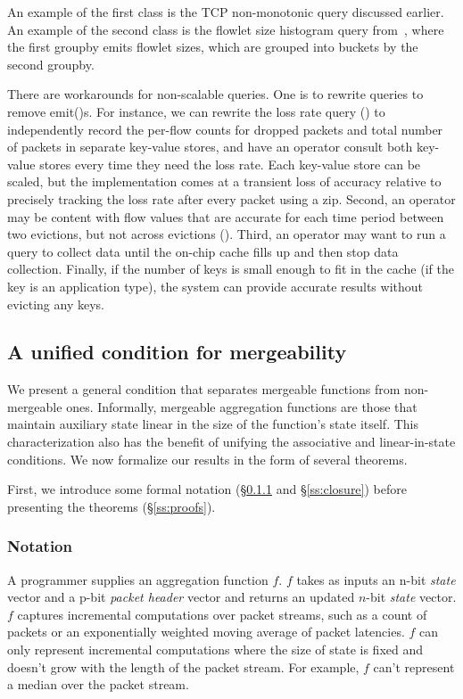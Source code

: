 An example of the first class is the TCP non-monotonic query discussed earlier.
An example of the second class is the flowlet size histogram
query from~, where the first {\ct groupby} emits
flowlet sizes, which are grouped into buckets by the second {\ct groupby}.

There are workarounds for non-scalable queries. One is to rewrite queries to
remove {\ct emit()}s.  For instance, we can rewrite the loss rate query
() to independently record the per-flow counts for
dropped packets and total number of packets in separate key-value stores, and
have an operator consult both key-value stores every time they need the loss
rate. Each key-value store can be scaled, but the implementation comes at a
transient loss of accuracy relative to precisely tracking the loss rate after
every packet using a {\ct zip.} Second, an operator may be content with flow
values that are accurate for each time period between two evictions, but not
across evictions (). Third, an operator may want to run a
query to collect data until the on-chip cache fills up and then stop data
collection.  Finally, if the number of keys is small enough to fit in the cache
(\eg if the key is an application type), the system can provide accurate
results without evicting any keys.

\subsection{A unified condition for mergeability}
\label{sec:unifies}
We present a general condition that separates mergeable functions from
non-mergeable ones.
Informally, mergeable aggregation functions are those that maintain auxiliary state
linear in the size
of the function's state itself.
This characterization also has the benefit of unifying the associative and
linear-in-state conditions.
We now formalize
our results in the form of several theorems.

First, we introduce some formal notation (\S\ref{ss:notation} and \S\ref{ss:closure})
before presenting the theorems (\S\ref{ss:proofs}).

\subsubsection{Notation}
\label{ss:notation}

A programmer supplies an aggregation function $f$. $f$ takes as inputs an n-bit \emph{state}
vector and a p-bit \emph{packet header} vector and returns an updated $n$-bit
\emph{state} vector. $f$ captures incremental computations over packet streams,
such as a count of packets or an exponentially weighted moving average of
packet latencies. $f$ can only represent incremental computations where the
size of state is fixed and doesn't grow with the length of the packet stream.
For example, $f$ can't represent a median over the packet stream.

